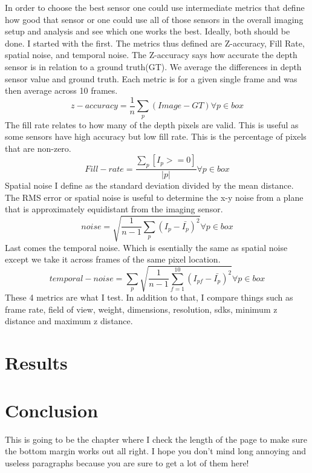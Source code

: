 In order to choose the best sensor one could use intermediate metrics that define how good that sensor or one could use all of those sensors in the overall imaging setup and analysis and see which one works the best. Ideally, both should be done. I started with the first. The metrics thus defined are Z-accuracy, Fill Rate, spatial noise, and temporal noise. The Z-accuracy says how accurate the depth sensor is in relation to a ground truth(GT). We average the differences in depth sensor value and ground truth. Each metric is for a given single frame and was then average across 10 frames.
\begin{equation}
	z-accuracy = \frac{1}{n}\sum_p(Image - GT) \forall p \in box
\end{equation}
The fill rate relates to how many of the depth pixels are valid. This is useful as some sensors have high accuracy but low fill rate. This is the percentage of pixels that are non-zero.
\begin{equation}
	Fill-rate = \frac{\sum_p[I_p >= 0]}{\vert p \vert} \forall p \in box
\end{equation}
Spatial noise I define as the standard deviation divided by the mean distance.
The RMS error or spatial noise is useful to determine the x-y noise from a plane that is approximately equidistant from the imaging sensor.
\begin{equation}
	noise = \sqrt{\frac{1}{n-1}\sum_p(I_p-{\bar{I_p}})^2} \forall p \in box
\end{equation}
Last comes the temporal noise. Which is esentially the same as spatial noise except we take it across frames of the same pixel location.
\begin{equation}
	temporal-noise = \sum_p\sqrt{\frac{1}{n-1}\sum_{f=1}^{10}(I_{pf}-\bar{I_p})^2} \forall p \in box
\end{equation}
These 4 metrics are what I test. In addition to that, I compare things such as frame rate, field of view, weight, dimensions, resolution, sdks, minimum z distance and maximum z distance.
\chapter{Results}
\chapter{Conclusion}

This is going to be the chapter where I check the length of the page to make
sure the bottom margin works out all right.  I hope you don't mind long
annoying and useless paragraphs because you are sure to get a lot of them here!


